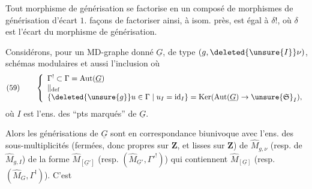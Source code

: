 Tout morphisme de générisation se factorise en un composé de morphismes de générisation d'écart $1$.   façons de factoriser ainsi, à isom. près, est égal à $\delta!$, où $\delta$ est l'écart du morphisme de générisation.

Considérons, pour un MD-graphe donné $\underline{G}$, de type  $(g,\deleted{\unsure{I}}\nu)$,   schémas modulaires 
et aussi l'inclusion
où
\[
\text{(59)}\qquad
\left\{\begin{array}{l}
\Gamma^!\subset\Gamma=\operatorname{Aut}(\underline G)\\
\Vert_{\mathrm{def}}\\
\{\deleted{\unsure{g}}u\in\Gamma\mid u_I=\operatorname{id}_I\}=\operatorname{Ker}(\operatorname{Aut}(\underline G)\to\unsure{\mathfrak S}_I),
\end{array}\right.
\]
où $I$ est l'ens. des ``pts marqués'' de $\underline G$.

Alors les  générisations de $\underline G$ sont en correspondance biunivoque avec l'ens. des sous-multiplicités (fermées,  donc propres sur $\mathbf Z$, et lisses sur $\mathbf Z$) de $\widehat M_{g,\nu}$ (resp. de $\widehat M_{g,I}$) de la forme $\widehat M_{[\underline G']}$ (resp. $(\widehat M_{\underline G'},\Gamma'^!)$) qui contiennent $\widehat M_{[\underline G]}$ (resp. $(\widehat M_G,\Gamma^!)$). C'est
